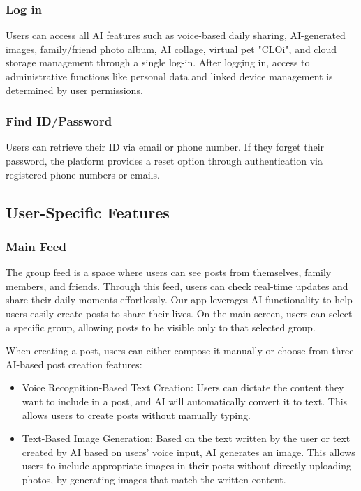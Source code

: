 \documentclass[conference]{IEEEtran}
\begin{document}
        \subsubsection{Log in}
            Users can access all AI features such as voice-based daily sharing, AI-generated images, family/friend photo album, AI collage, virtual pet "CLOi", and cloud storage management through a single log-in. After logging in, access to administrative functions like personal data and linked device management is determined by user permissions.

        \subsubsection{Find ID/Password}
            Users can retrieve their ID via email or phone number. If they forget their password, the platform provides a reset option through authentication via registered phone numbers or emails.

    \subsection{User-Specific Features}
        \subsubsection{Main Feed}
            The group feed is a space where users can see posts from themselves, family members, and friends. Through this feed, users can check real-time updates and share their daily moments effortlessly. Our app leverages AI functionality to help users easily create posts to share their lives. On the main screen, users can select a specific group, allowing posts to be visible only to that selected group.

            When creating a post, users can either compose it manually or choose from three AI-based post creation features:
            \begin{itemize}
                \item Voice Recognition-Based Text Creation: Users can dictate the content they want to include in a post, and AI will automatically convert it to text. This allows users to create posts without manually typing.
                \item Text-Based Image Generation: Based on the text written by the user or text created by AI based on users' voice input, AI generates an image. This allows users to include appropriate images in their posts without directly uploading photos, by generating images that match the written content.
            \end{itemize}
\end{document}
